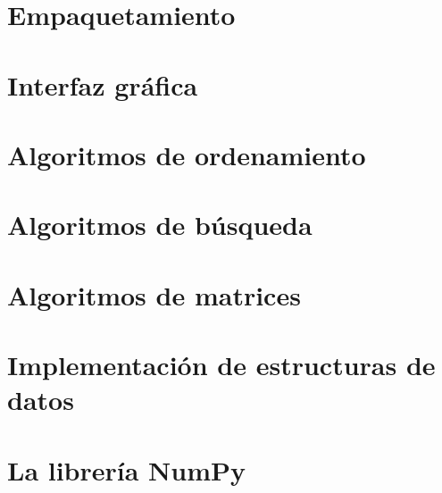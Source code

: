 \documentclass{article}
\begin{document}
\section{Empaquetamiento}

\section{Interfaz gráfica}

\section{Algoritmos de ordenamiento}

\section{Algoritmos de búsqueda}

\section{Algoritmos de matrices}

\section{Implementación de estructuras de datos}

\section{La librería NumPy}
\end{document}
